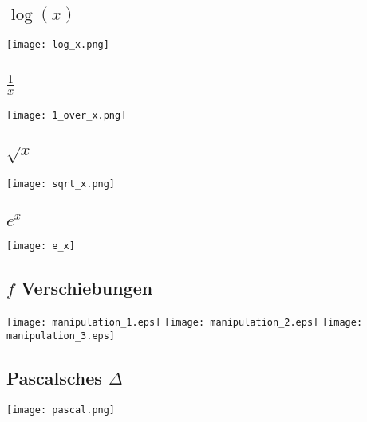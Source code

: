 \begin{multicols}{2}
\subsection{$\log(x)$}
\texttt{[image: log\_x.png]}

\subsection{$\frac{1}{x}$}
\texttt{[image: 1\_over\_x.png]}

\subsection{$\sqrt{x}$}
\texttt{[image: sqrt\_x.png]}

\subsection{$e^x$}
\texttt{[image: e\_x]}

\subsection{\small $f$ Verschiebungen}
\texttt{[image: manipulation\_1.eps]}
\texttt{[image: manipulation\_2.eps]}
\texttt{[image: manipulation\_3.eps]}

\subsection{Pascalsches $\Delta$}
\texttt{[image: pascal.png]}
\end{multicols}